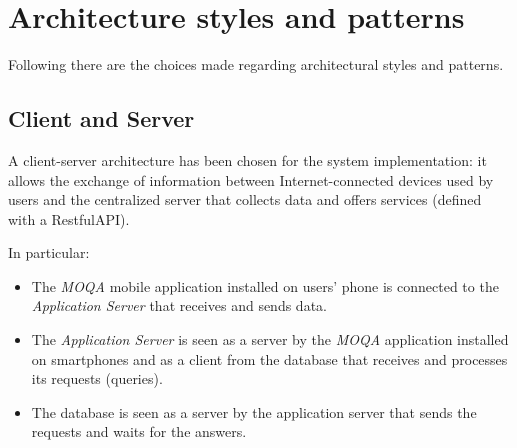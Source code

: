 \section{Architecture styles and patterns}
Following there are the choices made regarding architectural styles and patterns.

\subsection{Client and Server}
A client-server architecture has been chosen for the system implementation: it allows the exchange of information between Internet-connected devices used by users and the centralized server that collects data and offers services (defined with a RestfulAPI).

In particular:
\begin{itemize}
  \item The \textit{MOQA} mobile application installed on users' phone is connected to the \textit{Application Server} that receives and sends data.
  \item The \textit{Application Server} is seen as a server by the \textit{MOQA} application installed on smartphones and as a client from the database that receives and processes its requests (queries).
  \item The database is seen as a server by the application server that sends the requests and waits for the answers.
\end{itemize}

